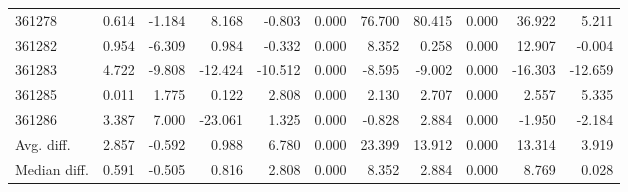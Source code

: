 \begin{tabular}{lrrrrrrrrrr}
361278 & 0.614 & -1.184 & 8.168 & -0.803 & 0.000 & 76.700 & 80.415 & 0.000 & 36.922 & 5.211 \\
361282 & 0.954 & -6.309 & 0.984 & -0.332 & 0.000 & 8.352 & 0.258 & 0.000 & 12.907 & -0.004 \\
361283 & 4.722 & -9.808 & -12.424 & -10.512 & 0.000 & -8.595 & -9.002 & 0.000 & -16.303 & -12.659 \\
361285 & 0.011 & 1.775 & 0.122 & 2.808 & 0.000 & 2.130 & 2.707 & 0.000 & 2.557 & 5.335 \\
361286 & 3.387 & 7.000 & -23.061 & 1.325 & 0.000 & -0.828 & 2.884 & 0.000 & -1.950 & -2.184 \\
Avg. diff. & 2.857 & -0.592 & 0.988 & 6.780 & 0.000 & 23.399 & 13.912 & 0.000 & 13.314 & 3.919 \\
Median diff. & 0.591 & -0.505 & 0.816 & 2.808 & 0.000 & 8.352 & 2.884 & 0.000 & 8.769 & 0.028 \\
\bottomrule
\end{tabular}
